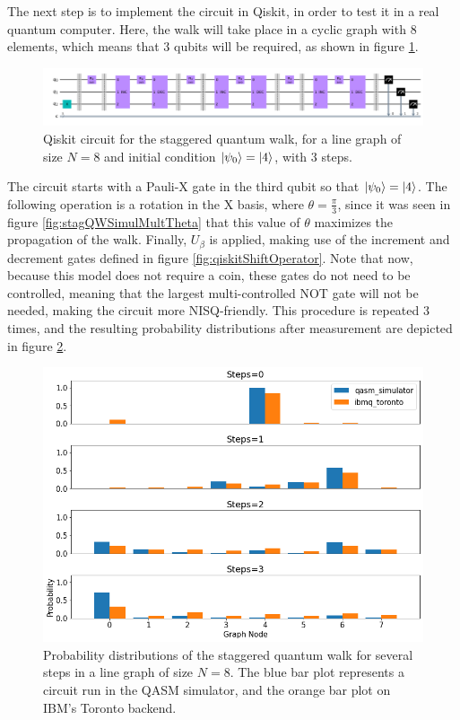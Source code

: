 \documentclass[../../dissertation.tex]{subfiles}
\begin{document}
The next step is to implement the circuit in Qiskit, in order to test it in a
real quantum computer. Here, the walk will take place in a cyclic graph with
$8$ elements, which means that 3 qubits will be required, as shown in figure
\ref{fig:stagQWCircuitQistkit}.
\begin{figure}[!h]
	\centering
	\includegraphics[scale=0.30]{img/Qiskit/StaggeredQW/Circuits/circStagQW_N3_S3.png}
	\caption{Qiskit circuit for the staggered quantum walk, for a line graph of size $N=8$ and initial condition $\ket{\psi_0}=\ket{4}$, with $3$ steps.} 
	\label{fig:stagQWCircuitQistkit}
\end{figure}
The circuit starts with a Pauli-X gate in the third qubit so that $\ket{\psi_0}
= \ket{4}$. The following operation is a rotation in the X basis, where $\theta
= \frac{\pi}{3}$, since it was seen in figure \ref{fig:stagQWSimulMultTheta}
that this value of $\theta$ maximizes the propagation of the walk. Finally,
$U_\beta$ is applied, making use of the increment and decrement gates defined
in figure \ref{fig:qiskitShiftOperator}. Note
that now, because this model does not require a coin, these gates do not need
to be controlled, meaning that the largest multi-controlled NOT gate will not
be needed, making the circuit more NISQ-friendly. This procedure is repeated
$3$ times, and the resulting probability distributions after measurement are depicted in figure \ref{fig:stagQWQiskitDist}. 
\begin{figure}[!h]
	\centering
	\includegraphics[scale=0.40]{img/Qiskit/StaggeredQW/StagQW_N3_S0123.png}
	\caption{Probability distributions of the staggered quantum walk for several steps in a line graph of size $N=8$. The blue bar plot represents a circuit run in the QASM simulator, and the orange bar plot on IBM's Toronto backend.} 
	\label{fig:stagQWQiskitDist}
\end{figure}\par
\end{document}
